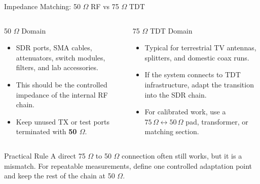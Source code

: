 \documentclass{beamer}
\begin{document}
\begin{frame}{Impedance Matching: 50 $\Omega$ RF vs 75 $\Omega$ TDT}
    \small
    \begin{columns}[T]
        \begin{block}{50 $\Omega$ Domain}
            \begin{itemize}
                \item SDR ports, SMA cables, attenuators, switch modules, filters, and lab accessories.
                \item This should be the controlled impedance of the internal RF chain.
                \item Keep unused TX or test ports terminated with \textbf{50 $\Omega$}.
            \end{itemize}
        \end{block}

        \begin{block}{75 $\Omega$ TDT Domain}
            \begin{itemize}
                \item Typical for terrestrial TV antennas, splitters, and domestic coax runs.
                \item If the system connects to TDT infrastructure, adapt the transition into the SDR chain.
                \item For calibrated work, use a \textbf{$75\,\Omega \leftrightarrow 50\,\Omega$} pad, transformer, or matching section.
            \end{itemize}
        \end{block}
    \end{columns}

    \vspace{0.5em}

    \begin{alertblock}{Practical Rule}
        A direct 75 $\Omega$ to 50 $\Omega$ connection often still works, but it is a mismatch. For repeatable measurements, define one controlled adaptation point and keep the rest of the chain at 50 $\Omega$.
    \end{alertblock}
\end{frame}
\end{document}
